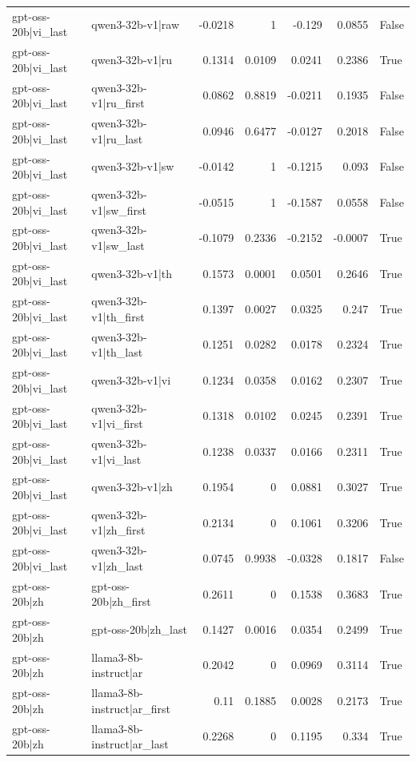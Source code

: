 \begin{table}
\begin{tabular}{l l r r r r l}
gpt-oss-20b|vi_last & qwen3-32b-v1|raw & -0.0218 & 1 & -0.129 & 0.0855 & False \\
gpt-oss-20b|vi_last & qwen3-32b-v1|ru & 0.1314 & 0.0109 & 0.0241 & 0.2386 & True \\
gpt-oss-20b|vi_last & qwen3-32b-v1|ru_first & 0.0862 & 0.8819 & -0.0211 & 0.1935 & False \\
gpt-oss-20b|vi_last & qwen3-32b-v1|ru_last & 0.0946 & 0.6477 & -0.0127 & 0.2018 & False \\
gpt-oss-20b|vi_last & qwen3-32b-v1|sw & -0.0142 & 1 & -0.1215 & 0.093 & False \\
gpt-oss-20b|vi_last & qwen3-32b-v1|sw_first & -0.0515 & 1 & -0.1587 & 0.0558 & False \\
gpt-oss-20b|vi_last & qwen3-32b-v1|sw_last & -0.1079 & 0.2336 & -0.2152 & -0.0007 & True \\
gpt-oss-20b|vi_last & qwen3-32b-v1|th & 0.1573 & 0.0001 & 0.0501 & 0.2646 & True \\
gpt-oss-20b|vi_last & qwen3-32b-v1|th_first & 0.1397 & 0.0027 & 0.0325 & 0.247 & True \\
gpt-oss-20b|vi_last & qwen3-32b-v1|th_last & 0.1251 & 0.0282 & 0.0178 & 0.2324 & True \\
gpt-oss-20b|vi_last & qwen3-32b-v1|vi & 0.1234 & 0.0358 & 0.0162 & 0.2307 & True \\
gpt-oss-20b|vi_last & qwen3-32b-v1|vi_first & 0.1318 & 0.0102 & 0.0245 & 0.2391 & True \\
gpt-oss-20b|vi_last & qwen3-32b-v1|vi_last & 0.1238 & 0.0337 & 0.0166 & 0.2311 & True \\
gpt-oss-20b|vi_last & qwen3-32b-v1|zh & 0.1954 & 0 & 0.0881 & 0.3027 & True \\
gpt-oss-20b|vi_last & qwen3-32b-v1|zh_first & 0.2134 & 0 & 0.1061 & 0.3206 & True \\
gpt-oss-20b|vi_last & qwen3-32b-v1|zh_last & 0.0745 & 0.9938 & -0.0328 & 0.1817 & False \\
gpt-oss-20b|zh & gpt-oss-20b|zh_first & 0.2611 & 0 & 0.1538 & 0.3683 & True \\
gpt-oss-20b|zh & gpt-oss-20b|zh_last & 0.1427 & 0.0016 & 0.0354 & 0.2499 & True \\
gpt-oss-20b|zh & llama3-8b-instruct|ar & 0.2042 & 0 & 0.0969 & 0.3114 & True \\
gpt-oss-20b|zh & llama3-8b-instruct|ar_first & 0.11 & 0.1885 & 0.0028 & 0.2173 & True \\
gpt-oss-20b|zh & llama3-8b-instruct|ar_last & 0.2268 & 0 & 0.1195 & 0.334 & True \\

\end{tabular}
\end{table}
